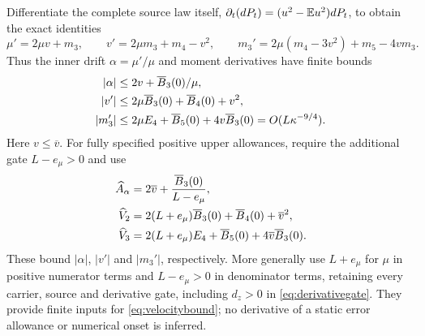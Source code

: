 Differentiate the complete source law itself,
$\partial_t(dP_t)=(u^2-\mathbb E u^2)dP_t$, to obtain the exact identities
\[
 \mu'=2\mu v+m_3,\qquad v'=2\mu m_3+m_4-v^2,\qquad
 m_3'=2\mu(m_4-3v^2)+m_5-4vm_3.
\]
Thus the inner drift $\alpha=\mu'/\mu$ and moment derivatives have
finite bounds
\begin{align}
 |\alpha|&\le2v+\overline B_3(0)/\mu,\notag\\
 |v'|&\le2\mu\overline B_3(0)+\overline B_4(0)+v^2,\notag\\
 |m_3'|&\le2\mu E_4+\overline B_5(0)
                         +4v\overline B_3(0)
             =O(L\kappa^{-9/4}).
 \label{eq:inner-source-derivative-allowances}
\end{align}
Here $v\le\overline v$. For fully specified positive upper allowances,
require the additional gate $L-e_\mu>0$ and use
\begin{align}
 \widehat A_\alpha&=2\overline v+
                   \frac{\overline B_3(0)}{L-e_\mu},\notag\\
 \widehat V_2&=2(L+e_\mu)\overline B_3(0)
                         +\overline B_4(0)+\overline v^2,\notag\\
 \widehat V_3&=2(L+e_\mu)E_4+\overline B_5(0)
                         +4\overline v\overline B_3(0).
 \label{eq:inner-explicit-derivative-allowances}
\end{align}
These bound $|\alpha|$, $|v'|$ and $|m_3'|$, respectively.
More generally use $L+e_\mu$ for $\mu$ in positive numerator terms
and $L-e_\mu>0$ in denominator terms, retaining every carrier,
source and derivative gate, including $d_z>0$ in
\eqref{eq:derivativegate}. They provide finite inputs for
\eqref{eq:velocitybound}; no derivative of a static error allowance or
numerical onset is inferred.

